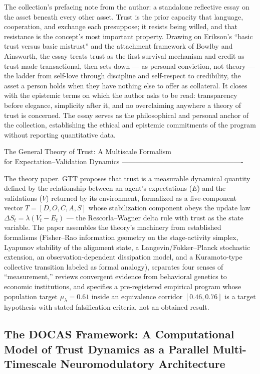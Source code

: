 \documentclass[
]{article}
\begin{document}
The collection's prefacing note from the author: a standalone reflective
essay on the asset beneath every other asset. Trust is the prior
capacity that language, cooperation, and exchange each presuppose; it
resists being willed, and that resistance is the concept's most
important property. Drawing on Erikson's ``basic trust versus basic
mistrust'' and the attachment framework of Bowlby and Ainsworth, the
essay treats trust as the first survival mechanism and credit as trust
made transactional, then sets down --- as personal conviction, not
theory --- the ladder from self-love through discipline and self-respect
to credibility, the asset a person holds when they have nothing else to
offer as collateral. It closes with the epistemic terms on which the
author asks to be read: transparency before elegance, simplicity after
it, and no overclaiming anywhere a theory of trust is concerned. The
essay serves as the philosophical and personal anchor of the collection,
establishing the ethical and epistemic commitments of the program
without reporting quantitative data.

The General Theory of Trust: A Multiscale Formalism\\
for Expectation--Validation Dynamics
----------------------------------------------------

The theory paper. GTT proposes that trust is a measurable dynamical
quantity defined by the relationship between an agent's expectations
(\(E\)) and the validations (\(V\)) returned by its environment,
formalized as a five-component vector \(T = [D, O, C, A, S]\) whose
stabilization component obeys the update law
\(\Delta S_t = \lambda(V_t - E_t)\) --- the Rescorla--Wagner delta rule
with trust as the state variable. The paper assembles the theory's
machinery from established formalisms (Fisher--Rao information geometry
on the stage-activity simplex, Lyapunov stability of the alignment
state, a Langevin/Fokker--Planck stochastic extension, an
observation-dependent dissipation model, and a Kuramoto-type collective
transition labeled as formal analogy), separates four senses of
``measurement,'' reviews convergent evidence from behavioral genetics to
economic institutions, and specifies a pre-registered empirical program
whose population target \(\mu_\lambda = 0.61\) inside an equivalence
corridor \([0.46, 0.76]\) is a target hypothesis with stated
falsification criteria, not an obtained result.

\subsection{The DOCAS Framework: A Computational Model of Trust Dynamics
as a Parallel Multi-Timescale Neuromodulatory
Architecture}\label{the-docas-framework-a-computational-model-of-trust-dynamics-as-a-parallel-multi-timescale-neuromodulatory-architecture}
\end{document}
